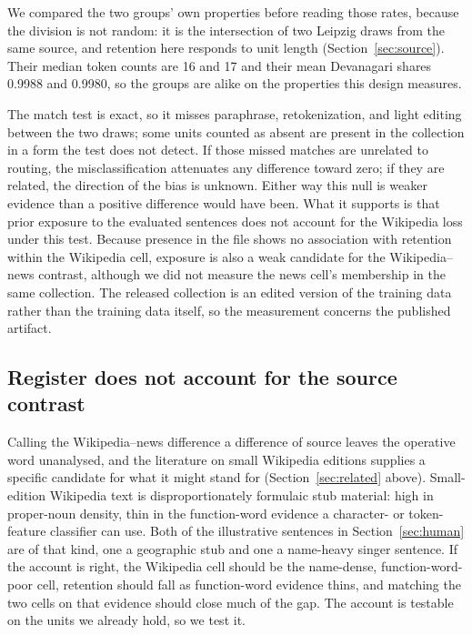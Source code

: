 \documentclass[final]{clv2025}
\begin{document}
We compared the two groups' own properties before reading those rates, because the division is not random: it is the intersection of two Leipzig draws from the same source, and retention here responds to unit length (Section~\ref{sec:source}). Their median token counts are 16 and 17 and their mean Devanagari shares 0.9988 and 0.9980, so the groups are alike on the properties this design measures.

The match test is exact, so it misses paraphrase, retokenization, and light editing between the two draws; some units counted as absent are present in the collection in a form the test does not detect. If those missed matches are unrelated to routing, the misclassification attenuates any difference toward zero; if they are related, the direction of the bias is unknown. Either way this null is weaker evidence than a positive difference would have been. What it supports is that prior exposure to the evaluated sentences does not account for the Wikipedia loss under this test. Because presence in the file shows no association with retention within the Wikipedia cell, exposure is also a weak candidate for the Wikipedia--news contrast, although we did not measure the news cell's membership in the same collection. The released collection is an edited version of the training data rather than the training data itself, so the measurement concerns the published artifact.

\subsection{Register does not account for the source contrast}\label{sec:register}

Calling the Wikipedia--news difference a difference of source leaves the operative word unanalysed, and the literature on small Wikipedia editions supplies a specific candidate for what it might stand for (Section~\ref{sec:related} above). Small-edition Wikipedia text is disproportionately formulaic stub material: high in proper-noun density, thin in the function-word evidence a character- or token-feature classifier can use. Both of the illustrative sentences in Section~\ref{sec:human} are of that kind, one a geographic stub and one a name-heavy singer sentence. If the account is right, the Wikipedia cell should be the name-dense, function-word-poor cell, retention should fall as function-word evidence thins, and matching the two cells on that evidence should close much of the gap. The account is testable on the units we already hold, so we test it.
\end{document}
